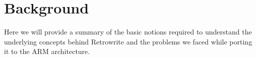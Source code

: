 \documentclass[a4paper,11pt,oneside]{report}
\begin{document}






\chapter{Background}

Here we will provide a summary of the basic notions required to understand the 
underlying concepts behind Retrowrite and the problems we faced while porting 
it to the ARM architecture. 
\end{document}
